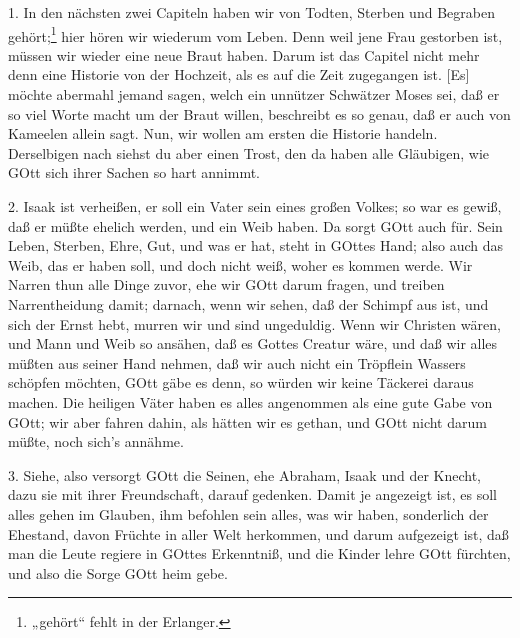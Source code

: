 1. In den nächsten zwei Capiteln haben wir von Todten, Sterben und Begraben gehört;\footnote{„gehört“ fehlt in der Erlanger.} hier hören wir wiederum vom Leben. Denn weil jene Frau gestorben ist, müssen wir wieder eine neue Braut haben. Darum ist das Capitel nicht mehr denn eine Historie von der Hochzeit, als es auf die Zeit zugegangen ist. [Es] möchte abermahl jemand sagen, welch ein unnützer Schwätzer Moses sei, daß er so viel Worte macht um der Braut willen, beschreibt es so genau, daß er auch von Kameelen allein sagt. Nun, wir wollen am ersten die Historie handeln. Derselbigen nach siehst du aber einen Trost, den da haben alle Gläubigen, wie GOtt sich ihrer Sachen so hart annimmt.

2. Isaak ist verheißen, er soll ein Vater sein eines großen Volkes; so war es gewiß, daß er müßte ehelich werden, und ein Weib haben. Da sorgt GOtt auch für. Sein Leben, Sterben, Ehre, Gut, und was er hat, steht in GOttes Hand; also auch das Weib, das er haben soll, und doch nicht weiß, woher es kommen werde. Wir Narren thun alle Dinge zuvor, ehe wir GOtt darum fragen, und treiben Narrentheidung damit; darnach, wenn wir sehen, daß der Schimpf aus ist, und sich der Ernst hebt, murren wir und sind ungeduldig. Wenn wir Christen wären, und Mann und Weib so ansähen, daß
es Gottes Creatur wäre, und daß wir alles müßten aus seiner Hand nehmen, daß wir auch nicht ein Tröpflein Wassers schöpfen möchten, GOtt gäbe es denn, so würden wir keine Täckerei daraus machen. Die heiligen Väter haben es alles angenommen als eine gute Gabe von GOtt; wir aber fahren dahin, als hätten wir es gethan, und GOtt nicht darum müßte, noch sich’s annähme.

3. Siehe, also versorgt GOtt die Seinen, ehe Abraham, Isaak und der Knecht, dazu sie mit ihrer Freundschaft, darauf gedenken. Damit je angezeigt ist, es soll alles gehen im Glauben, ihm befohlen sein alles, was wir haben, sonderlich der Ehestand, davon Früchte in aller Welt herkommen, und darum aufgezeigt ist, daß man die Leute regiere in GOttes Erkenntniß, und die Kinder lehre GOtt fürchten, und also die Sorge GOtt heim gebe.

